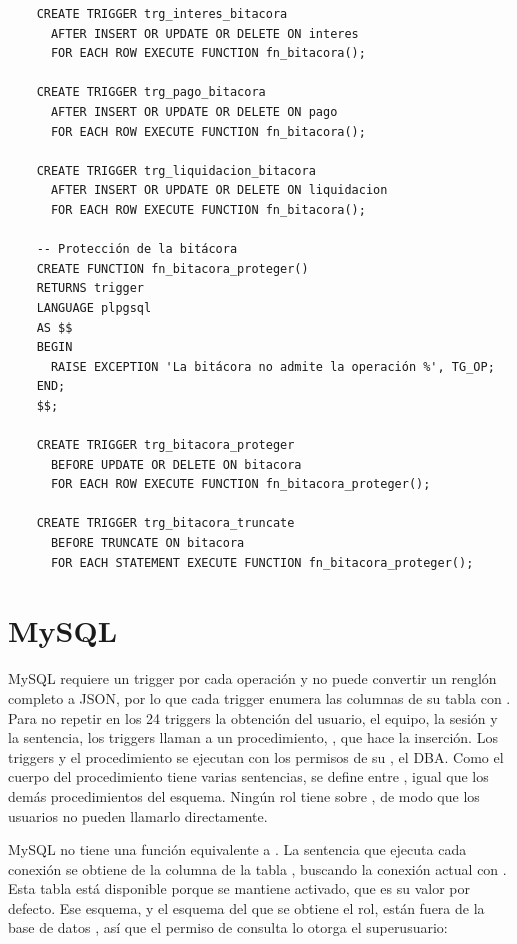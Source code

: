 \begin{verbatim}
	CREATE TRIGGER trg_interes_bitacora
	  AFTER INSERT OR UPDATE OR DELETE ON interes
	  FOR EACH ROW EXECUTE FUNCTION fn_bitacora();

	CREATE TRIGGER trg_pago_bitacora
	  AFTER INSERT OR UPDATE OR DELETE ON pago
	  FOR EACH ROW EXECUTE FUNCTION fn_bitacora();

	CREATE TRIGGER trg_liquidacion_bitacora
	  AFTER INSERT OR UPDATE OR DELETE ON liquidacion
	  FOR EACH ROW EXECUTE FUNCTION fn_bitacora();

	-- Protección de la bitácora
	CREATE FUNCTION fn_bitacora_proteger()
	RETURNS trigger
	LANGUAGE plpgsql
	AS $$
	BEGIN
	  RAISE EXCEPTION 'La bitácora no admite la operación %', TG_OP;
	END;
	$$;

	CREATE TRIGGER trg_bitacora_proteger
	  BEFORE UPDATE OR DELETE ON bitacora
	  FOR EACH ROW EXECUTE FUNCTION fn_bitacora_proteger();

	CREATE TRIGGER trg_bitacora_truncate
	  BEFORE TRUNCATE ON bitacora
	  FOR EACH STATEMENT EXECUTE FUNCTION fn_bitacora_proteger();
\end{verbatim}

\section{MySQL}

MySQL requiere un trigger por cada operación y no puede convertir un renglón completo a JSON, por lo que cada trigger enumera las columnas de su tabla con . Para no repetir en los 24 triggers la obtención del usuario, el equipo, la sesión y la sentencia, los triggers llaman a un procedimiento, , que hace la inserción. Los triggers y el procedimiento se ejecutan con los permisos de su , el DBA. Como el cuerpo del procedimiento tiene varias sentencias, se define entre , igual que los demás procedimientos del esquema. Ningún rol tiene  sobre , de modo que los usuarios no pueden llamarlo directamente.

MySQL no tiene una función equivalente a . La sentencia que ejecuta cada conexión se obtiene de la columna  de la tabla , buscando la conexión actual con . Esta tabla está disponible porque  se mantiene activado, que es su valor por defecto. Ese esquema, y el esquema  del que se obtiene el rol, están fuera de la base de datos , así que el permiso de consulta lo otorga el superusuario:


